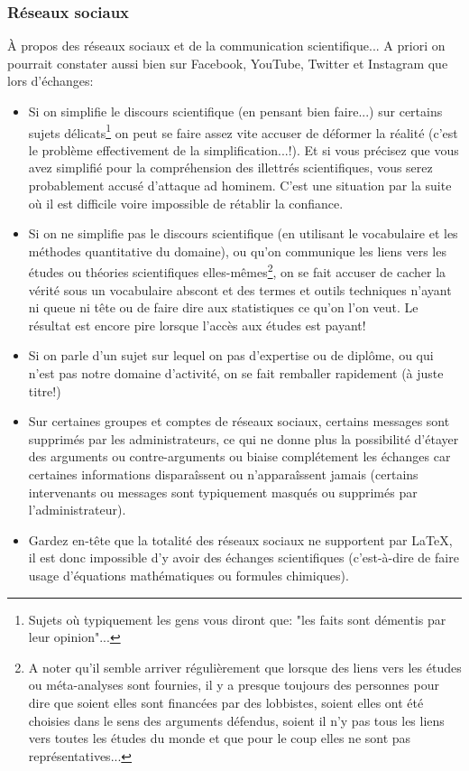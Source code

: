 	\subsubsection{Réseaux sociaux}		
	À propos des réseaux sociaux et de la communication scientifique... A priori on pourrait constater aussi bien sur Facebook, YouTube, Twitter et Instagram que lors d'échanges:
	\begin{itemize}
		\item Si on simplifie le discours scientifique (en pensant bien faire...) sur certains sujets délicats\footnote{Sujets où typiquement les gens vous diront que: "les faits sont démentis par leur opinion"...} on peut se faire assez vite accuser de déformer la réalité (c'est le problème effectivement de la simplification...!). Et si vous précisez que vous avez simplifié pour la compréhension des illettrés scientifiques, vous serez probablement accusé d’attaque ad hominem. C'est une situation par la suite où il est difficile voire impossible de rétablir la confiance.
	
		\item Si on ne simplifie pas le discours scientifique (en utilisant le vocabulaire et les méthodes quantitative du domaine), ou qu'on communique les liens vers les études ou théories scientifiques elles-mêmes\footnote{A noter qu'il semble arriver régulièrement que lorsque des liens vers les études ou méta-analyses sont fournies, il y a presque toujours des personnes pour dire que soient elles sont financées par des lobbistes, soient elles ont été choisies dans le sens des arguments défendus, soient il n'y pas tous les liens vers toutes les études du monde et que pour le coup elles ne sont pas représentatives...}, on se fait accuser de cacher la vérité sous un vocabulaire abscont et des termes et outils techniques n'ayant ni queue ni tête ou de faire dire aux statistiques ce qu'on l'on veut. Le résultat est encore pire lorsque l'accès aux études est payant!
	
		\item Si on parle d'un sujet sur lequel on pas d'expertise ou de diplôme, ou qui n'est pas notre domaine d'activité, on se fait remballer rapidement (à juste titre!)
	
		\item Sur certaines groupes et comptes de réseaux sociaux, certains messages sont supprimés par les administrateurs, ce qui ne donne plus la possibilité d'étayer des arguments ou contre-arguments ou biaise complétement les échanges car certaines informations disparaîssent  ou n'apparaîssent jamais (certains intervenants ou messages sont typiquement masqués ou supprimés par l'administrateur).
	
		\item Gardez en-tête que la totalité des réseaux sociaux ne supportent par \LaTeX{}, il est donc impossible d'y avoir des échanges scientifiques (c'est-à-dire de faire usage d'équations mathématiques ou formules chimiques).
	\end{itemize}
